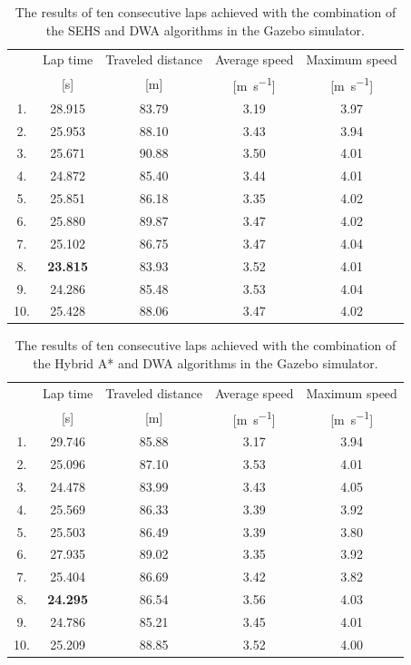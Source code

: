 \begin{table}
	\centering
	\begin{tabular}{c c c c c}
		\toprule
		    & Lap time       & Traveled distance  & Average speed             & Maximum speed             \\
		    & [\si{\second}] & [\si{\meter}]      & [\si{\meter\per\second}]  & [\si{\meter\per\second}]  \\
		\midrule
		1. & 28.915 & 83.79 & 3.19 & 3.97 \\
		2. & 25.953 & 88.10 & 3.43 & 3.94 \\
		3. & 25.671 & 90.88 & 3.50 & 4.01 \\
		4. & 24.872 & 85.40 & 3.44 & 4.01 \\
		5. & 25.851 & 86.18 & 3.35 & 4.02 \\
		6. & 25.880 & 89.87 & 3.47 & 4.02 \\
		7. & 25.102 & 86.75 & 3.47 & 4.04 \\
		8. & \bfseries 23.815 & 83.93 & 3.52 & 4.01 \\
		9. & 24.286 & 85.48 & 3.53 & 4.04 \\
		10. & 25.428 & 88.06 & 3.47 & 4.02 \\
		\bottomrule
	\end{tabular}
	\caption{The results of ten consecutive laps achieved with the combination of the SEHS and DWA algorithms in the Gazebo simulator.}
	\label{tbl:dwa-sehs}
\end{table}

\begin{table}
	\centering
	\begin{tabular}{c c c c c}
		\toprule
		& Lap time       & Traveled distance  & Average speed             & Maximum speed             \\
		& [\si{\second}] & [\si{\meter}]      & [\si{\meter\per\second}]  & [\si{\meter\per\second}]  \\
		\midrule
		1. & 29.746 & 85.88 & 3.17 &  3.94 \\
		2. & 25.096 & 87.10 & 3.53 &  4.01 \\
		3. & 24.478 & 83.99 & 3.43 &  4.05 \\
		4. & 25.569 & 86.33 & 3.39 &  3.92 \\
		5. & 25.503 & 86.49 & 3.39 &  3.80 \\
		6. & 27.935 & 89.02 & 3.35 &  3.92 \\
		7. & 25.404 & 86.69 & 3.42 &  3.82 \\
		8. & \bfseries 24.295 & 86.54 & 3.56 &  4.03 \\
		9. & 24.786 & 85.21 & 3.45 &  4.01 \\
		10. & 25.209 & 88.85 & 3.52 &  4.00 \\
		\bottomrule
	\end{tabular}
	\caption{The results of ten consecutive laps achieved with the combination of the Hybrid A* and DWA algorithms in the Gazebo simulator.}
	\label{tbl:dwa-hybrid-astar}
\end{table}

